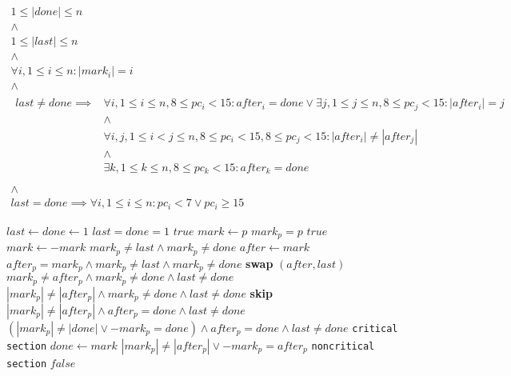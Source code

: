 \documentclass{article}
\author{Виталий Кирсанов}
\begin{document}
\begin{displaymath}
\begin{matrix}
    1 \leq |done| \leq n \\
    \land \\
    1 \leq |last| \leq n \\
    \land \\
    \forall i, 1 \leq i \leq n : |mark_i| = i \\
    \land \\
    \begin{array}{ll}
        last \neq done \implies &\forall i, 1 \leq i \leq n, 8 \leq pc_i < 15 : after_i = done \lor \exists j, 1 \leq j \leq n, 8 \leq pc_j < 15 : |after_i| = j \\
                                &\land \\
                                &\forall i,j, 1 \leq i < j \leq n, 8 \leq pc_i < 15, 8 \leq pc_j < 15 : |after_i| \neq |after_j| \\
                                &\land \\
                                &\exists k, 1 \leq k \leq n, 8 \leq pc_k < 15 : after_k = done \\
    \end{array} \\
    \land \\
    last = done \implies \forall i, 1 \leq i \leq n : pc_i < 7 \lor pc_i \geq 15
\end{matrix}
\end{displaymath}

\begin{algorithmic}[1]
\State $ last \gets done \gets 1 $                  \Comment $ last = done = 1 $
                       \Comment $ true $
    \State $ mark \gets p $                         \Comment $ mark_p = p $
                                    \Comment $ true $
        \State $ mark \gets -mark $                 \Comment $ mark_p \neq last \land mark_p \neq done $
        \State $ after \gets mark $                 \Comment $ after_p = mark_p \land mark_p \neq last \land mark_p \neq done $
        \State \textbf{swap} $ (after, last) $      \Comment $ mark_p \neq after_p \land mark_p \neq done \land last \neq done $
                           \Comment $ |mark_p| \neq |after_p| \land mark_p \neq done \land last \neq done $
                \State \textbf{skip}
            \EndWhile                               \Comment $ |mark_p| \neq |after_p| \land after_p = done \land last \neq done $
        \EndIf                                      \Comment $ (|mark_p| \neq |done| \lor -mark_p = done) \land after_p = done \land last \neq done $
        \State \texttt{critical section}
        \State $ done \gets mark $                  \Comment $ |mark_p| \neq |after_p| \lor -mark_p = after_p $
        \State \texttt{noncritical section}
    \EndWhile                                       \Comment $ false $
\EndProcedure
\end{algorithmic}
\end{document}
